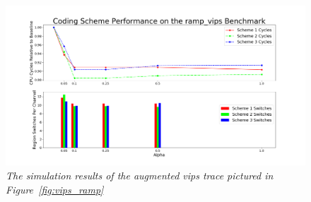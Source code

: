 \begin{figure}[htbp]
		\includegraphics[width=\linewidth]{fig/vips_ramp_results.png}
		\caption{\it{The simulation results of the augmented vips trace pictured in Figure~\ref{fig:vips_ramp}}}
		\label{fig:vips_ramp_result}
\end{figure}


